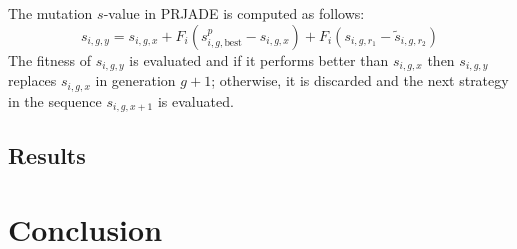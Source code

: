 \documentclass[conference]{IEEEtran}
\begin{document}
The mutation $s$-value in PRJADE is computed as follows:
\[
    s_{i,g,y}=s_{i,g,x}+F_i\left(s^p_{i,g,\text{best}} - s_{i,g,x}\right) + F_i\left(s_{i,g,r_1} - \tilde{s}_{i,g,r_2}\right)
\]
The fitness of $s_{i,g,y}$ is evaluated and if it performs better than $s_{i,g,x}$ then $s_{i,g,y}$ replaces $s_{i,g,x}$ in generation $g+1$; otherwise, it is discarded and the next strategy in the sequence $s_{i,g,x+1}$ is evaluated.

\subsection{Results}

\section{Conclusion}



\end{document}
